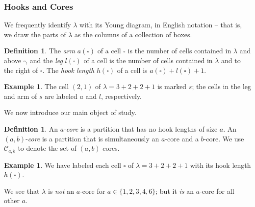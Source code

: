 \documentclass{amsart}[12pt]
\theoremstyle{definition}
\newtheorem{example}[dummy]{Example}
\newtheorem{definition}[dummy]{Definition}
\begin{document}
\subsubsection{Hooks and Cores}
We frequently identify $\lambda$ with its Young diagram, in
English notation -- that is, we draw the parts of $\lambda$ as
the columns of a collection of boxes.
\begin{definition}
The \emph{arm} $a(\square)$ of a cell $\square$ is the number of cells contained in $\lambda$ and above $\square$, and the \emph{leg} $l(\square)$ of a cell is the number of cells contained in $\lambda$ and to the right of $\square$.
The \emph{hook length} $h(\square)$ of a cell is $a(\square)+l(\square)+1$.
\end{definition}
\begin{example}
The cell $(2,1)$ of $\lambda=3+2+2+1$ is marked $s$; the cells in the
leg and arm of $s$ are labeled $a$ and $l$, respectively.
\begin{center}
\end{center}
\end{example}
We now introduce our main object of study.
\begin{definition}
An $a$-\emph{core} is a partition that has no hook lengths of size $a$. An $(a,b)$-\emph{core} is a partition that is simultaneously an $a$-core and a $b$-core.  We use $\mathcal{C}_{a,b}$ to denote the set of $(a,b)$-cores.
\end{definition}
\begin{example}
We have labeled each cell $\square$ of $\lambda=3+2+2+1$ with its hook length $h(\square)$.
\begin{center}
\end{center}
We see that $\lambda$ is \emph{not} an $a$-core for $a\in \{1,2,3,4,6\}$;
but it \emph{is} an $a$-core for all other $a$.
\end{example}
\end{document}

